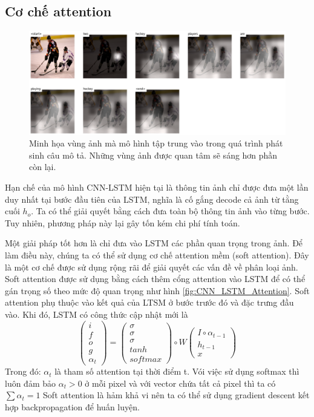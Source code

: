\documentclass[conference]{IEEEtran}
\begin{document}
\subsection{Cơ chế attention}
\begin{figure}[t]
\centering
\includegraphics[width=\textwidth]{assets/attention.png}
  \caption{Minh họa vùng ảnh mà mô hình tập trung vào trong quá trình phát sinh câu mô tả. Những vùng ảnh được quan tâm sẽ sáng hơn phần còn lại.}
  \label{fig:RNN_LSTM_attention}
\end{figure}

Hạn chế của mô hình CNN-LSTM hiện tại là thông tin ảnh chỉ được đưa một lần duy nhất tại bước đầu tiên của LSTM, nghĩa là cố gắng decode cả ảnh từ tằng cuối $h_o$.
Ta có thể giải quyết bằng cách đưa toàn bộ thông tin ảnh vào từng bước.
Tuy nhiên, phương pháp này lại gây tốn kém chi phí tính toán.

Một giải pháp tốt hơn là chỉ đưa vào LSTM các phần quan trọng trong ảnh. Để làm điều này, chúng ta có thể sử dụng cơ chế attention mềm (soft attention). Đây là một cơ chế được sử dụng rộng rãi  
để giải quyết các vấn đề về phân loại ảnh. Soft attention được sử dụng bằng cách thêm cổng attention vào LSTM để có thể gán trọng số theo mức độ quan trọng như hình \ref{fig:CNN_LSTM_Attention}. Soft attention phụ thuộc vào kết quả của LTSM ở bước trước đó và đặc trưng đầu vào.  Khi đó, LSTM có công thức cập nhật mới là
$$
\begin{pmatrix}
i \\f \\o \\g \\\alpha_t
\end{pmatrix}
= 
\begin{pmatrix}
\sigma \\ \sigma \\ \sigma \\ tanh \\ softmax
\end{pmatrix}
\circ
W
\begin{pmatrix}
I \circ \alpha_{t-1} \\ h_{t-1} \\ x
\end{pmatrix}
$$
Trong đó: $\alpha_t$ là tham số attention tại thời điểm t. Vói việc sử dụng softmax thì luôn đảm bảo $\alpha_t>0$ ở mỗi pixel và với vector chứa tất cả pixel thì ta có $\sum{}{}\alpha_t=1$ Soft attention là hảm khả vi nên ta có thể sử dụng gradient descent kết hợp backpropagation để huấn luyện. 
\end{document}
